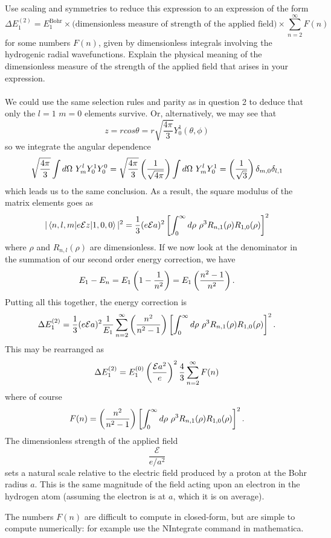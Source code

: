 \documentclass[10pt,letterpaper]{article}
\begin{document}
		\item
		Use scaling and symmetries to reduce this expression to an expression of the form
		\[
			\Delta E_1^{(2)} = E_1^{\text{Bohr}}\times\text{(dimensionless measure of strength of the applied field)}
			\times \sum_{n=2}^\infty F(n)
		\]
		for some numbers $F(n)$, given by dimensionless integrals involving the hydrogenic radial wavefunctions. Explain
		the physical meaning of the dimensionless measure of the strength of the applied field that arises in your expression.
		\\
		\\
		We could use the same selection rules and parity as in question 2 to deduce that only the $l=1$ $m=0$ elements survive. Or,
		alternatively, we may see that
		\[
			z = rcos\theta = r\sqrt{\frac{4\pi}{3}}Y_0^1(\theta,\phi)
		\]
		so we integrate the angular dependence
		\[
			\sqrt{\frac{4\pi}{3}}\int d\Omega\ Y_m^lY_0^1Y_0^0 = \sqrt{\frac{4\pi}{3}}\pfrac{1}{\sqrt{4\pi}}
			\int d\Omega\ Y_m^lY_0^1=  \pfrac{1}{\sqrt 3} \delta_{m,0}\delta_{l,1}
		\]
		which leads us to the same conclusion. As a result, the square modulus of the matrix elements goes as
		\[
			|\braket{n,l,m|e\mathcal E z|1,0,0}|^2 = \frac{1}{3}(e\mathcal E a)^2
			\left[\int_0^\infty d\rho\ \rho^3 R_{n,1}(\rho)R_{1,0}(\rho)\right]^2
		\]
		where $\rho$ and $R_{n,l}(\rho)$ are dimensionless. If we now look at the denominator in the summation
		of our second order energy correction, we have
		\[
			E_1 - E_n = E_1\left(1-\frac{1}{n^2}\right) = E_1\left(\frac{n^2-1}{n^2}\right).
		\]
		Putting all this together, the energy correction is
		\[
			\Delta E_1^{(2)} = \frac{1}{3}(e\mathcal E a)^2\frac{1}{E_1}\sum_{n=2}^\infty
			\left(\frac{n^2}{n^2-1}\right)\left[\int_0^\infty d\rho\ \rho^3 R_{n,1}(\rho)R_{1,0}(\rho)\right]^2.
		\]
		This may be rearranged as
		\[
			\Delta E_1^{(2)} = E_1^{(0)}\left(\frac{\mathcal E a^2}{e}\right)^2 \frac{4}{3}
			\sum_{n=2}^\infty F(n)
		\]
		where of course
		\[
			F(n) = \left(\frac{n^2}{n^2-1}\right)\left[\int_0^\infty d\rho\ \rho^3 R_{n,1}(\rho)R_{1,0}(\rho)\right]^2.
		\]
		The dimensionless strength of the applied field
		\[
			\frac{\mathcal E}{e/a^2}
		\]
		sets a natural scale relative to the electric field produced by a proton at the Bohr radius $a$. This is the same
		magnitude of the field acting upon an electron in the hydrogen atom (assuming the electron is at $a$, which it is 
		on average).  
		\\
		\item
		The numbers $F(n)$ are difficult to compute in closed-form, but are simple to compute numerically: for example
		use the NIntegrate command in mathematica.\\
\end{document}
